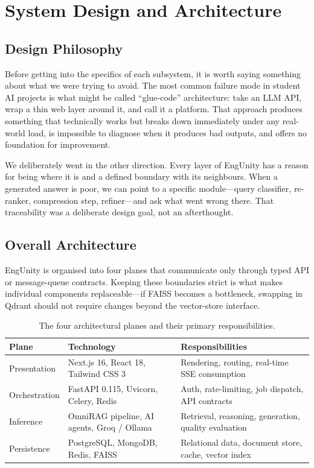 \chapter{System Design and Architecture}
\label{chap:design}

\section{Design Philosophy}
\label{sec:design-philosophy}

Before getting into the specifics of each subsystem, it is worth saying something
about what we were trying to avoid. The most common failure mode in student AI
projects is what might be called ``glue-code'' architecture: take an LLM API,
wrap a thin web layer around it, and call it a platform. That approach produces
something that technically works but breaks down immediately under any real-world
load, is impossible to diagnose when it produces bad outputs, and offers no
foundation for improvement.

We deliberately went in the other direction. Every layer of EngUnity has a reason
for being where it is and a defined boundary with its neighbours. When a generated
answer is poor, we can point to a specific module---query classifier, re-ranker,
compression step, refiner---and ask what went wrong there. That traceability was
a deliberate design goal, not an afterthought.

\section{Overall Architecture}
\label{sec:architecture}

EngUnity is organised into four planes that communicate only through typed API or
message-queue contracts. Keeping these boundaries strict is what makes individual
components replaceable---if FAISS becomes a bottleneck, swapping in Qdrant should
not require changes beyond the vector-store interface.

\begin{table}[ht]
    \centering
    \caption{The four architectural planes and their primary responsibilities.}
    \label{tab:planes}
    \begin{tabular}{lll}
        \toprule
        \textbf{Plane} & \textbf{Technology} & \textbf{Responsibilities} \\
        \midrule
        Presentation   & Next.js 16, React 18, Tailwind CSS 3 &
            Rendering, routing, real-time SSE consumption \\
        Orchestration  & FastAPI 0.115, Uvicorn, Celery, Redis &
            Auth, rate-limiting, job dispatch, API contracts \\
        Inference      & OmniRAG pipeline, AI agents, Groq / Ollama &
            Retrieval, reasoning, generation, quality evaluation \\
        Persistence    & PostgreSQL, MongoDB, Redis, FAISS &
            Relational data, document store, cache, vector index \\
        \bottomrule
    \end{tabular}
\end{table}

